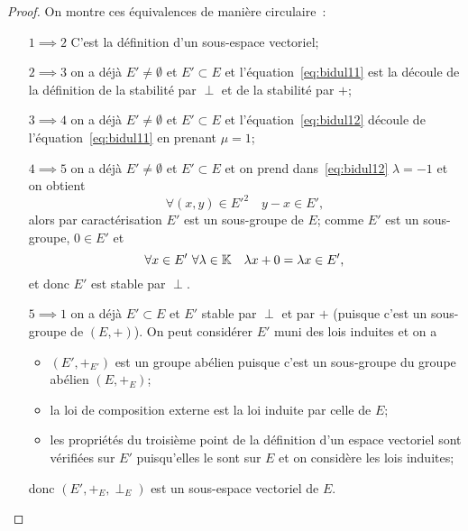 \begin{proof}
  On montre ces équivalences de manière circulaire~:
  \begin{itemize}
    \item[\(1 \implies 2\)] C'est la définition d'un sous-espace vectoriel;
    \item[\(2 \implies 3\)] on a déjà \(E' \neq \emptyset\) et \(E' \subset E\) 
      et l'équation~\eqref{eq:bidul11} est la découle de la définition de la 
      stabilité par \(\perp\) et de la stabilité par \(+\);
    \item[\(3 \implies 4\)] on a déjà \(E' \neq \emptyset\) et \(E' \subset E\) 
      et l'équation~\eqref{eq:bidul12} découle de l'équation~\eqref{eq:bidul11} 
      en prenant \(\mu=1\);
    \item[\(4 \implies 5\)] on a déjà \(E' \neq \emptyset\) et \(E' \subset E\) 
      et on prend dans~\eqref{eq:bidul12} \(\lambda=-1\) et on obtient
      \begin{equation}
        \forall (x,y) \in E'^2 \quad y-x \in E',
      \end{equation}
      alors par caractérisation \(E'\) est un sous-groupe de \(E\); comme \(E'\) 
      est un sous-groupe, \(0 \in E'\) et
      \begin{equation}
        \forall x \in E' \ \forall \lambda \in \mathbb{K} \quad \lambda x +0=\lambda x 
        \in E',
      \end{equation}
      et donc \(E'\) est stable par \(\perp\).
    \item[\(5 \implies 1\)] on a déjà \(E' \subset E\) et \(E'\) stable par 
      \(\perp\) et par \(+\) (puisque c'est un sous-groupe de \((E,+)\)). On 
      peut considérer \(E'\) muni des lois induites et on a
      \begin{itemize}
        \item \((E',+_{E'})\) est un groupe abélien puisque c'est un sous-groupe 
          du groupe abélien \((E,+_E)\);
        \item la loi de composition externe est la loi induite par celle de 
          \(E\);
        \item les propriétés du troisième point de la définition d'un espace 
          vectoriel sont vérifiées sur \(E'\) puisqu'elles le sont sur \(E\) et 
          on considère les lois induites;
      \end{itemize}
      donc \((E',+_E,\perp_E)\) est un sous-espace vectoriel de \(E\).
  \end{itemize}
\end{proof}

